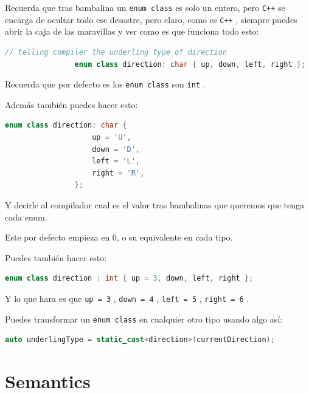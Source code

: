 \documentclass[12pt, fleqn]{report}                             %
\theoremstyle{break}                                            %
\newcommand{\textCode}[1]  { \texttt{#1} }                      %
\newcommand{\Cpp}{\ignorespaces\textCode{C++}}                  %
\begin{document}
            Recuerda que tras bambalina un \textCode{enum class} es solo un entero, pero \Cpp
            se encarga de ocultar todo ese desastre, pero claro, como es \Cpp, siempre puedes
            abrir la caja de las maravillas y ver como es que funciona todo esto:
            \begin{lstlisting}[language=C++, gobble=16]
                // telling compiler the underling type of direction
                enum class direction: char { up, down, left, right };
            \end{lstlisting}

            Recuerda que por defecto es los \textCode{enum class} son \textCode{int}.

            Además también puedes hacer esto:
            \begin{lstlisting}[language=C++, gobble=16]
                enum class direction: char { 
                    up = 'U', 
                    down = 'D', 
                    left = 'L',  
                    right = 'R', 
                };
            \end{lstlisting}

            Y decirle al compilador cual es el valor tras bambalinas que queremos que tenga
            cada enum.

            Este por defecto empieza en 0, o su equivalente en cada tipo.

            Puedes también hacer esto:
            \begin{lstlisting}[language=C++, gobble=16]
                enum class direction : int { up = 3, down, left, right };
            \end{lstlisting}

            Y lo que hara es que \textCode{up = 3}, \textCode{down = 4}, \textCode{left = 5}, 
            \textCode{right = 6}.

            Puedes transformar un \textCode{enum class} en cualquier otro tipo usando algo así:
            \begin{lstlisting}[language=C++, gobble=16]
                auto underlingType = static_cast<direction>(currentDirection);
            \end{lstlisting}


        \clearpage
        \section{Semantics}   
\end{document}
